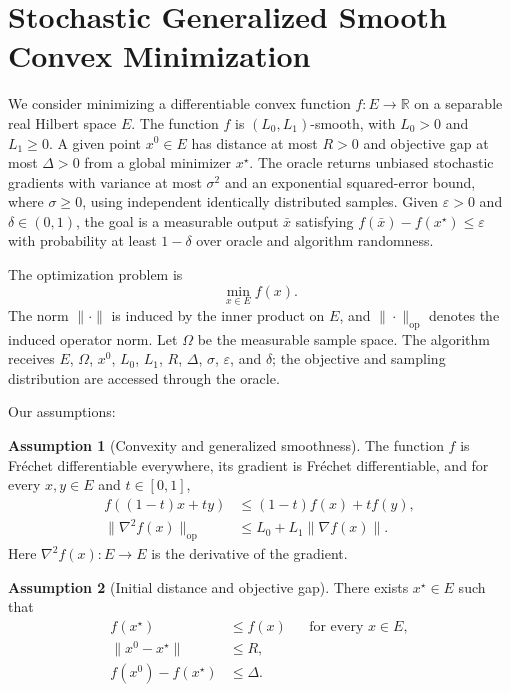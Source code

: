 \documentclass[10pt]{article}
\theoremstyle{definition}
\newtheorem{assumption}{Assumption}
\begin{document}
\section*{Stochastic Generalized Smooth Convex Minimization}
We consider minimizing a differentiable convex function $f:E\to\mathbb{R}$ on a separable real Hilbert space $E$. The function $f$ is $(L_0,L_1)$-smooth, with $L_0>0$ and $L_1\geq0$. A given point $x^0\in E$ has distance at most $R>0$ and objective gap at most $\Delta>0$ from a global minimizer $x^\star$. The oracle returns unbiased stochastic gradients with variance at most $\sigma^2$ and an exponential squared-error bound, where $\sigma\geq0$, using independent identically distributed samples. Given $\varepsilon>0$ and $\delta\in(0,1)$, the goal is a measurable output $\bar{x}$ satisfying $f(\bar{x})-f(x^\star)\leq\varepsilon$ with probability at least $1-\delta$ over oracle and algorithm randomness.

The optimization problem is
\[
\min_{x\in E} f(x).
\]
The norm $\|\cdot\|$ is induced by the inner product on $E$, and $\|\cdot\|_{\mathrm{op}}$ denotes the induced operator norm. Let $\Omega$ be the measurable sample space. The algorithm receives $E$, $\Omega$, $x^0$, $L_0$, $L_1$, $R$, $\Delta$, $\sigma$, $\varepsilon$, and $\delta$; the objective and sampling distribution are accessed through the oracle.

Our assumptions:
\begin{assumption}[Convexity and generalized smoothness]
The function $f$ is Fr\'echet differentiable everywhere, its gradient is Fr\'echet differentiable, and for every $x,y\in E$ and $t\in[0,1]$,
\[
\begin{aligned}
f((1-t)x+ty)&\leq (1-t)f(x)+t f(y),\\
\|\nabla^2 f(x)\|_{\mathrm{op}}&\leq L_0+L_1\|\nabla f(x)\|.
\end{aligned}
\]
Here $\nabla^2 f(x):E\to E$ is the derivative of the gradient.
\end{assumption}

\begin{assumption}[Initial distance and objective gap]
There exists $x^\star\in E$ such that
\[
\begin{aligned}
f(x^\star)&\leq f(x) &&\text{for every }x\in E,\\
\|x^0-x^\star\|&\leq R,\\
f(x^0)-f(x^\star)&\leq\Delta.
\end{aligned}
\]
\end{assumption}
\end{document}
